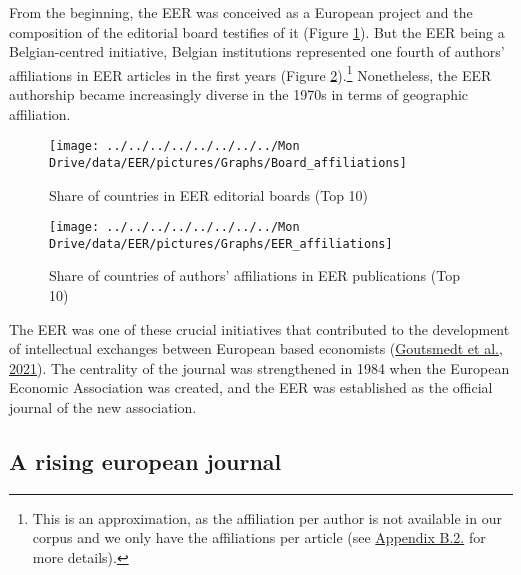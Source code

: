 \documentclass[
  12pt,
  onecolumn]{article}
\begin{document}
From the beginning, the EER was conceived as a European project and the
composition of the editorial board testifies of it (Figure
\ref{fig:plot-boards}). But the EER being a Belgian-centred initiative,
Belgian institutions represented one fourth of authors' affiliations in
EER articles in the first years (Figure
\ref{fig:plot-authors}).\footnote{This is an approximation, as the
  affiliation per author is not available in our corpus and we only have
  the affiliations per article (see
  \protect\hyperlink{author-affiliation}{Appendix B.2.} for more
  details).} Nonetheless, the EER authorship became increasingly diverse
in the 1970s in terms of geographic affiliation.

\begin{figure}[h]

{\centering \texttt{[image: ../../../../../../../../Mon Drive/data/EER/pictures/Graphs/Board\_affiliations]} 

}

\caption{Share of countries in EER editorial boards (Top 10)}\label{fig:plot-boards}
\end{figure}

\begin{figure}[h]

{\centering \texttt{[image: ../../../../../../../../Mon Drive/data/EER/pictures/Graphs/EER\_affiliations]} 

}

\caption{Share of countries of authors' affiliations in EER publications (Top 10)}\label{fig:plot-authors}
\end{figure}

The EER was one of these crucial initiatives that contributed to the
development of intellectual exchanges between European based economists
(\protect\hyperlink{ref-goutsmedt2021}{Goutsmedt et al., 2021}). The
centrality of the journal was strengthened in 1984 when the European
Economic Association was created, and the EER was established as the
official journal of the new association.

\hypertarget{rising-journal}{%
\subsection{A rising european journal}\label{rising-journal}}
\end{document}
